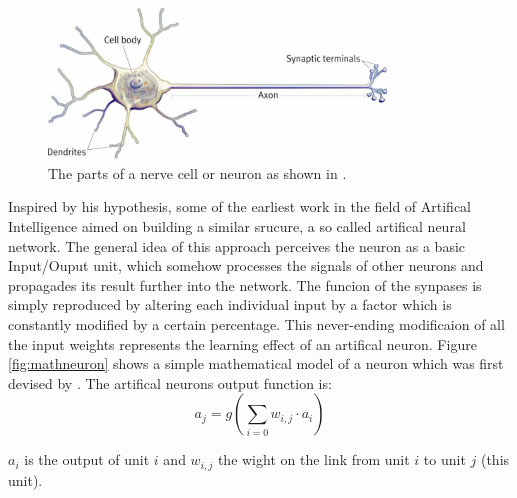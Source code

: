 \documentclass[10pt,a4paper,DIV=11]{scrreprt}
\begin{document}
\begin{center}
\begin{figure}[H]
\includegraphics[width=0.8\textwidth,scale=1]{files/neuron.jpg}  
\caption{The parts of a nerve cell or neuron as shown in \cite{NEU}.}
\label{fig:neuron}
\end{figure}
\end{center}


Inspired by his hypothesis, some of the earliest work in the field of Artifical Intelligence aimed on building a similar srucure, a so called artifical neural network. The general idea of this approach perceives the neuron as a basic Input/Ouput unit, which somehow processes the signals of other neurons and propagades its result further into the network. The funcion of the synpases is simply reproduced by altering each individual input by a  factor which is constantly modified by a certain percentage. This never-ending modificaion of all the input weights represents the learning effect of an artifical neuron. Figure \ref{fig:mathneuron} shows a simple mathematical model of a neuron which was first devised by \cite{NEURONMATH}. The artifical neurons output function is:\\

\begin{equation}
a_j = g(\sum_{i=0}^{} w_{i,j} \cdot a_{i})
\end{equation}

$a_{i}$ is the output of unit ${i}$ and $w_{i,j}$ the wight on the link from unit $i$ to unit $j$ (this unit). 
\end{document}
